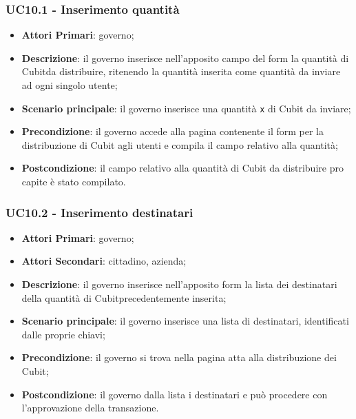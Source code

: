 \subsubsection{UC10.1 - Inserimento quantità}
\begin{itemize}
	\item \textbf{Attori Primari}: governo;
	\item \textbf{Descrizione}: il governo inserisce nell'apposito campo del form la quantità di Cubit\glosp da distribuire, ritenendo la quantità inserita come quantità da inviare ad ogni singolo utente;
	\item \textbf{Scenario principale}: il governo inserisce una quantità \texttt{x} di Cubit da inviare;
	\item \textbf{Precondizione}: il governo accede alla pagina contenente il form per la distribuzione di Cubit agli utenti e compila il campo relativo alla quantità;
	\item \textbf{Postcondizione}: il campo relativo alla quantità di Cubit da distribuire pro capite è stato compilato. 
\end{itemize}
\subsubsection{UC10.2 - Inserimento destinatari}
\begin{itemize}
	\item \textbf{Attori Primari}: governo;
	\item \textbf{Attori Secondari}: cittadino, azienda;
	\item \textbf{Descrizione}: il governo inserisce nell'apposito form la lista dei destinatari della quantità di Cubit\glosp precedentemente inserita;
	\item \textbf{Scenario principale}: il governo inserisce una lista di destinatari, identificati dalle proprie chiavi\glo;
	\item \textbf{Precondizione}: il governo si trova nella pagina atta alla distribuzione dei Cubit;
	\item \textbf{Postcondizione}: il governo dalla lista i destinatari e può procedere con l'approvazione della transazione.
\end{itemize}
